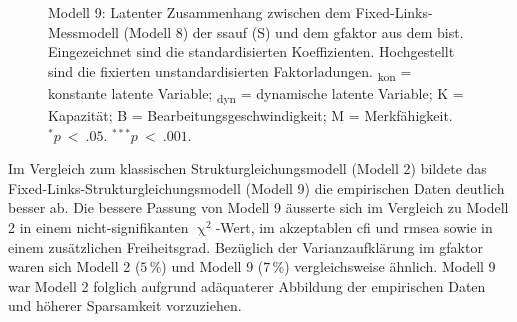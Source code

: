 \documentclass[11pt, twoside, a4paper]{book}		%
\begin{document}
\begin{figure}[htbp]
\begin{adjustbox}{width=1\textwidth}
	\end{adjustbox}
	
	\vspace{.2cm}
	\caption[Modell 9: Fixed-Links-Struk\-tur\-glei\-chungs\-mo\-dell zur Vorhersage des \gls{gfaktor}s durch die \gls{ssauf}]{Modell 9: Latenter Zusammenhang zwischen dem Fixed-Links-Messmodell (Modell 8) der \gls{ssauf} (\textsf{S}) und dem \gls{gfaktor} aus dem \gls{bist}. Eingezeichnet sind die standardisierten Koeffizienten. Hochgestellt sind die fixierten unstandardisierten Faktorladungen. \textsf{\textsubscript{kon}} = konstante latente Variable; \textsf{\textsubscript{dyn}} = dynamische latente Variable; \textsf{K} = Kapazität; \textsf{B} = Bearbeitungsgeschwindigkeit; \textsf{M} = Merkfähigkeit.\\
	$^{*}p~<~.05$. $^{***}p~<~.001$.
	}
	\label{fig:spatial_suppression_fixedlinks_sem}
\end{figure} 

Im Vergleich zum klassischen Strukturgleichungsmodell (Modell 2) bildete das Fixed-Links-Struk\-tur\-glei\-chungs\-mo\-dell (Modell 9) die empirischen Daten deutlich besser ab. Die bessere Passung von Modell 9 äusserte sich im Vergleich zu Modell 2 in einem nicht-signifikanten $\upchi^2$-Wert, im akzeptablen \gls{cfi} und \gls{rmsea} sowie in einem zusätzlichen Freiheitsgrad. Bezüglich der Varianzaufklärung im \gls{gfaktor} waren sich Modell 2 ($5\,\%$) und Modell 9 ($7\,\%$)  vergleichsweise ähnlich. Modell 9 war Modell 2 folglich aufgrund adäquaterer Abbildung der empirischen Daten und höherer Sparsamkeit vorzuziehen. 
\end{document}
